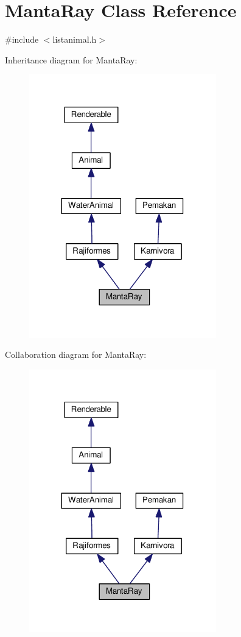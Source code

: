 \hypertarget{classMantaRay}{}\section{Manta\+Ray Class Reference}
\label{classMantaRay}


{\ttfamily \#include $<$listanimal.\+h$>$}



Inheritance diagram for Manta\+Ray\+:
\nopagebreak
\begin{figure}[H]
\begin{center}
\leavevmode
\includegraphics[width=230pt]{classMantaRay__inherit__graph}
\end{center}
\end{figure}


Collaboration diagram for Manta\+Ray\+:
\nopagebreak
\begin{figure}[H]
\begin{center}
\leavevmode
\includegraphics[width=230pt]{classMantaRay__coll__graph}
\end{center}
\end{figure}
